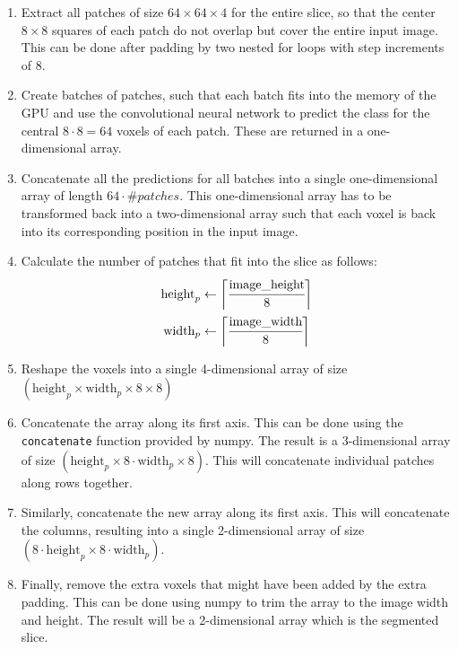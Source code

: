 \documentclass[12pt,a4paper,twoside,openright]{report}
\begin{document}
\begin{enumerate}
	\item Extract all patches of size $64 \times 64 \times 4$ for the entire slice, so that the center $8 \times 8$ squares of each patch do not overlap but cover the entire input image. This can be done after padding by two nested for loops with step increments of 8.
	\item Create batches of patches, such that each batch fits into the memory of the GPU and use the convolutional neural network to predict the class for the central $8 \cdot 8 = 64$ voxels of each patch. These are returned in a one-dimensional array.
	\item Concatenate all the predictions for all batches into a single one-dimensional array of length $64 \cdot \#patches$. This one-dimensional array has to be transformed back into a two-dimensional array such that each voxel is back into its corresponding position in the input image.
	\item Calculate the number of patches that fit into the slice as follows:
		\begin{equation}
		\begin{split}
			\text{height}_p & \gets \bigg \lceil \cfrac{\text{image\_height}}{8} \bigg \rceil 	 \\
			\text{width}_p & \gets \bigg \lceil \cfrac{\text{image\_width}}{8} \bigg \rceil 	 \\
		\end{split}		
		\end{equation}
	\item Reshape the voxels into a single 4-dimensional array of size $(\text{height}_p \times \text{width}_p \times 8 \times 8)$
	\item Concatenate the array along its first axis. This can be done using the \texttt{concatenate} function provided by numpy. The result is a 3-dimensional array of size $(\text{height}_p \times 8 \cdot \text{width}_p \times 8)$. This will concatenate individual patches along rows together.
	\item Similarly, concatenate the new array along its first axis. This will concatenate the columns, resulting into a single 2-dimensional array of size $(8 \cdot \text{height}_p \times 8 \cdot \text{width}_p)$.
	\item Finally, remove the extra voxels that might have been added by the extra padding. This can be done using numpy to trim the array to the image width and height. The result will be a 2-dimensional array which is the segmented slice.
\end{enumerate}
\end{document}
